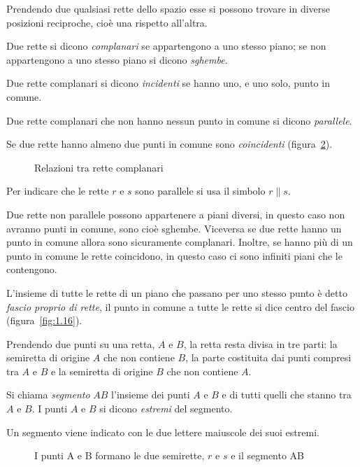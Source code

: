 Prendendo due qualsiasi rette dello spazio esse si possono trovare in diverse posizioni reciproche, cioè una rispetto all'altra.
\begin{definizione}
Due rette si dicono \emph{complanari} se appartengono a uno stesso piano; se non appartengono a uno stesso piano si dicono \emph{sghembe}.

Due rette complanari si dicono \emph{incidenti} se hanno uno, e uno solo, punto in comune.

Due rette complanari che non hanno nessun punto in comune si dicono \emph{parallele}.

Se due rette hanno almeno due punti in comune sono \emph{coincidenti} (figura~\ref{fig:1.12}).
\end{definizione}
\begin{figure}[b,t,h]
 \centering 
 \caption{Relazioni tra rette complanari}\label{fig:1.12}
\end{figure}
Per indicare che le rette $ r $ e $ s $ sono parallele si usa il simbolo $ r \parallel s $.

\osservazione Due rette non parallele possono appartenere a piani diversi, in questo caso non avranno punti in comune, sono cioè sghembe. Viceversa se due rette hanno un punto in comune allora sono sicuramente complanari. Inoltre, se hanno più di un punto in comune le rette coincidono, in questo caso ci sono infiniti piani che le contengono. 

\begin{definizione}
L'insieme di tutte le rette di un piano che passano per uno stesso punto è detto \emph{fascio proprio di rette}, il punto in comune a tutte le rette si dice centro del fascio (figura~\ref{fig:1.16}).
\end{definizione}

Prendendo due punti su una retta, $ A $ e $ B $, la retta resta divisa in tre parti: la semiretta di origine $ A $ che non contiene $ B $, la parte costituita dai punti compresi tra $ A $ e $ B $ e la semiretta di origine $ B $ che non contiene $ A $.

\begin{definizione}
Si chiama \emph{segmento} $ AB $ l'insieme dei punti $ A $ e $ B $ e di tutti quelli che stanno tra $ A $ e $ B $.
I punti $ A $ e $ B $ si dicono \emph{estremi} del segmento.
\end{definizione}
Un segmento viene indicato con le due lettere maiuscole dei suoi estremi.
\begin{figure}[b,t,h]
 \centering 
 \caption{I punti A e B formano le due semirette, $ r $ e $ s $ e il segmento AB}\label{fig:1.12}
\end{figure}

